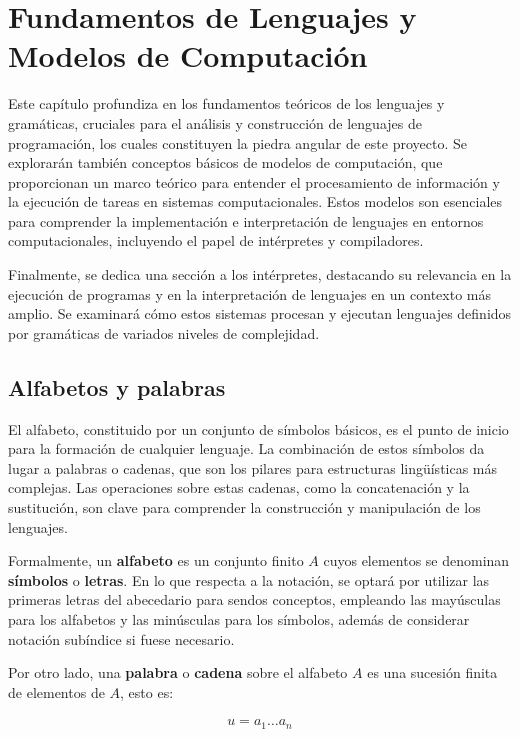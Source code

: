 \chapter{\textbf{Fundamentos de Lenguajes y Modelos de Computación}}
Este capítulo profundiza en los fundamentos teóricos de los lenguajes y gramáticas, cruciales para el análisis y construcción de lenguajes de programación, los cuales constituyen la piedra angular de este proyecto. Se explorarán también conceptos básicos de modelos de computación, que proporcionan un marco teórico para entender el procesamiento de información y la ejecución de tareas en sistemas computacionales. Estos modelos son esenciales para comprender la implementación e interpretación de lenguajes en entornos computacionales, incluyendo el papel de intérpretes y compiladores.

Finalmente, se dedica una sección a los intérpretes, destacando su relevancia en la ejecución de programas y en la interpretación de lenguajes en un contexto más amplio. Se examinará cómo estos sistemas procesan y ejecutan lenguajes definidos por gramáticas de variados niveles de complejidad.

\section{Alfabetos y palabras}\label{section:MCAlphabet}
El alfabeto, constituido por un conjunto de símbolos básicos, es el punto de inicio para la formación de cualquier lenguaje. La combinación de estos símbolos da lugar a palabras o cadenas, que son los pilares para estructuras lingüísticas más complejas. Las operaciones sobre estas cadenas, como la concatenación y la sustitución, son clave para comprender la construcción y manipulación de los lenguajes.

Formalmente, un \textbf{alfabeto} es un conjunto finito $A$ cuyos elementos se denominan \textbf{símbolos} o \textbf{letras}. En lo que respecta a la notación, se optará por utilizar las primeras letras del abecedario para sendos conceptos, empleando las mayúsculas para los alfabetos y las minúsculas para los símbolos, además de considerar notación subíndice si fuese necesario. 

Por otro lado, una \textbf{palabra} o \textbf{cadena} sobre el alfabeto $A$ es una sucesión finita de elementos de $A$, esto es:

\begin{align*}
    u = a_1 \ldots a_n
\end{align*}

